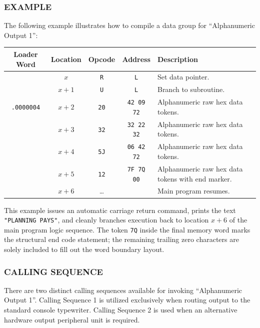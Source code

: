 \subsubsection*{EXAMPLE}
The following example illustrates how to compile a data group for ``Alphanumeric Output 1'':
\begin{center}
\small
\begin{tabularx}{\textwidth}{ccccX}
    \toprule
    \textbf{Loader Word} & \textbf{Location} & \textbf{Opcode} & \textbf{Address} & \textbf{Description} \\
    \midrule
                      & $x$   & \texttt{R}  & \texttt{L}        & Set data pointer. \\
                      & $x+1$ & \texttt{U}  & \texttt{L}        & Branch to subroutine. \\
    \texttt{.0000004} & $x+2$ & \texttt{20} & \texttt{42 09 72} & Alphanumeric raw hex data tokens. \\
                      & $x+3$ & \texttt{32} & \texttt{32 22 32} & Alphanumeric raw hex data tokens. \\
                      & $x+4$ & \texttt{5J} & \texttt{06 42 72} & Alphanumeric raw hex data tokens. \\
                      & $x+5$ & \texttt{12} & \texttt{7F 7Q 00} & Alphanumeric raw hex data tokens with end marker. \\
                      & $x+6$ & \dots       &                   & Main program resumes. \\
    \bottomrule
\end{tabularx}
\end{center}

This example issues an automatic carriage return command, prints the text \texttt{"PLANNING PAYS"}, and cleanly branches execution back to location $x+6$ of the main program logic sequence. The token \texttt{7Q} inside the final memory word marks the structural end code statement; the remaining trailing zero characters are solely included to fill out the word boundary layout.

\subsubsection*{CALLING SEQUENCE}
There are two distinct calling sequences available for invoking ``Alphanumeric Output 1''. Calling Sequence 1 is utilized exclusively when routing output to the standard console typewriter. Calling Sequence 2 is used when an alternative hardware output peripheral unit is required.

